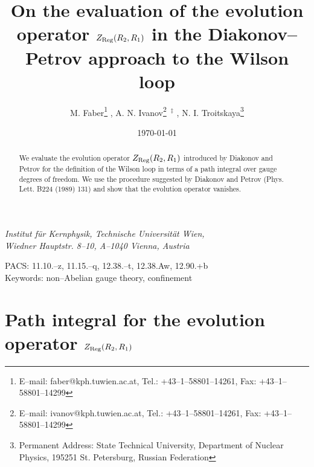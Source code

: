 \documentclass[a4paper,11pt]{article}
\begin{document}
\title{On the evaluation of the evolution operator $Z_{\rm
Reg}(R_2,R_1)$ in the Diakonov--Petrov approach to the Wilson
loop}

\author{M. Faber\thanks{E--mail: faber@kph.tuwien.ac.at, Tel.:
+43--1--58801--14261, Fax: +43--1--58801--14299} ,
A. N. Ivanov\thanks{E--mail: ivanov@kph.tuwien.ac.at, Tel.:
+43--1--58801--14261, Fax: +43--1--58801--14299}~$^{\ddagger}$ , N. I.
Troitskaya\thanks{Permanent Address: State
Technical University, Department of Nuclear Physics, 195251
St. Petersburg, Russian Federation}}

\date{\today}

\maketitle

\begin{center}
{\it Institut f\"ur Kernphysik, Technische Universit\"at Wien, \\ 
Wiedner Hauptstr. 8--10, A--1040 Vienna, Austria}
\end{center}

\begin{abstract}
We evaluate the evolution operator $Z_{\rm Reg}(R_2,R_1)$ introduced
by Diakonov and Petrov for the definition of the Wilson loop in terms
of a path integral over gauge degrees of freedom. We use the procedure
suggested by Diakonov and Petrov (Phys. Lett. B224 (1989) 131) and
show that the evolution operator vanishes.
\end{abstract}

\begin{center}
PACS: 11.10.--z, 11.15.--q, 12.38.--t, 12.38.Aw, 12.90.+b\\ 
Keywords: non--Abelian gauge theory, confinement
\end{center}



\section*{Path integral for the evolution operator $Z_{\rm Reg}(R_2,R_1)$ } 
\setcounter{equation}{0}
\end{document}

